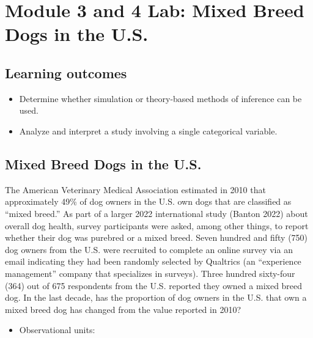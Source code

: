 \documentclass[
]{report}
\providecommand{\tightlist}{%
  \setlength{\itemsep}{0pt}\setlength{\parskip}{0pt}}
\begin{document}
\section{Module 3 and 4 Lab: Mixed Breed Dogs in the U.S.}\label{module-3-and-4-lab-mixed-breed-dogs-in-the-u.s.}


\subsection{Learning outcomes}\label{learning-outcomes-9}

\begin{itemize}
\item
  Determine whether simulation or theory-based methods of inference can be used.
\item
  Analyze and interpret a study involving a single categorical variable.
\end{itemize}

\subsection{Mixed Breed Dogs in the U.S.}\label{mixed-breed-dogs-in-the-u.s.}

The American Veterinary Medical Association estimated in 2010 that approximately 49\% of dog owners in the U.S. own dogs that are classified as ``mixed breed.'' As part of a larger 2022 international study ({Banton} 2022) about overall dog health, survey participants were asked, among other things, to report whether their dog was purebred or a mixed breed. Seven hundred and fifty (750) dog owners from the U.S. were recruited to complete an online survey via an email indicating they had been randomly selected by Qualtrics (an ``experience management'' company that specializes in surveys). Three hundred sixty-four (364) out of 675 respondents from the U.S. reported they owned a mixed breed dog. In the last decade, has the proportion of dog owners in the U.S. that own a mixed breed dog has changed from the value reported in 2010?

\vspace{1mm}

\begin{itemize}
\tightlist
\item
  Observational units:
\end{itemize}

\vspace{1mm}
\end{document}
